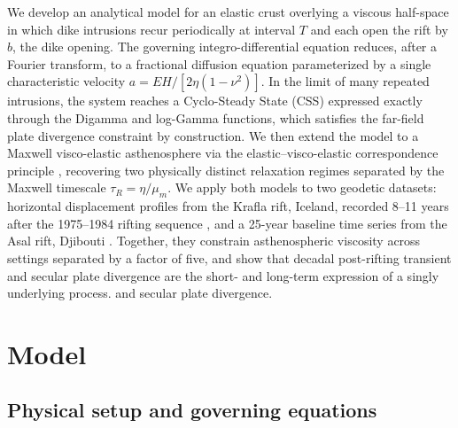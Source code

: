 \documentclass[extra]{gji}
\begin{document}
We develop an analytical model for an elastic crust overlying a viscous
half-space \citep{hetland2006thesis} in which dike intrusions recur periodically at
interval $T$ and each open the rift by $b$, the dike opening. The governing
integro-differential equation reduces, after a Fourier transform, to a
fractional diffusion equation \citep{metzler2000random,samko1993integration} parameterized by a single characteristic velocity
$a = EH/[2\eta(1-\nu^2)]$. In the limit of many repeated intrusions, the
system reaches a Cyclo-Steady State (CSS) expressed exactly through the
Digamma and log-Gamma functions, which satisfies the far-field plate
divergence constraint by construction. We then extend the model to a
Maxwell visco-elastic asthenosphere via the elastic--visco-elastic
correspondence principle \citep{hetland2005postseismic,barbot2010unified}, recovering two physically distinct relaxation regimes separated by
the Maxwell timescale $\tau_R = \eta/\mu_m$. We apply both models to two
geodetic datasets: horizontal displacement profiles from the Krafla rift,
Iceland, recorded 8--11 years after the 1975--1984 rifting sequence
\citep{foulger1992post}, and a 25-year baseline time series from the
Asal rift, Djibouti \citep{vigny2007twenty}. Together, they constrain asthenospheric viscosity across
settings separated by a factor of five, and show that decadal post-rifting transient and secular plate divergence are the short- and long-term expression of a singly underlying process.
and secular plate divergence.

\section{Model}
\label{sec:model}

\subsection{Physical setup and governing equations}
\label{sec:setup}
\end{document}
